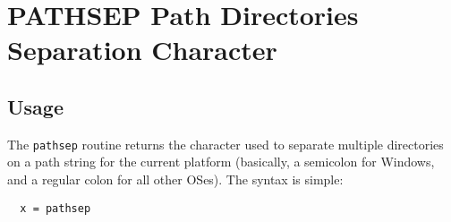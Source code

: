 \section{PATHSEP Path Directories Separation Character}

\subsection{Usage}

The \verb|pathsep| routine returns the character used to separate multiple directories
on a path string for the current platform (basically, a semicolon for Windows,
and a regular colon  for all other OSes).  The syntax is simple:
\begin{verbatim}
  x = pathsep
\end{verbatim}
